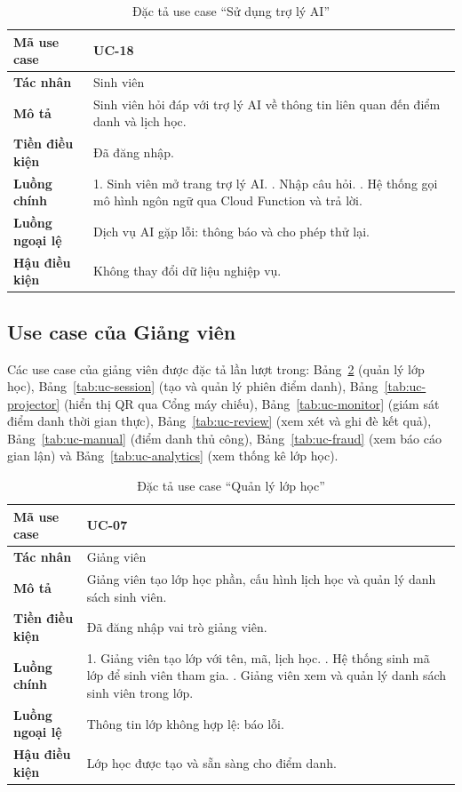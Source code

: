 \begin{table}[H]
\centering
\small
\caption{Đặc tả use case ``Sử dụng trợ lý AI''}
\label{tab:uc-ai}
\begin{tabular}{|p{3cm}|p{10.6cm}|}
\hline
\textbf{Mã use case} & UC-18 \\ \hline
\textbf{Tác nhân} & Sinh viên \\ \hline
\textbf{Mô tả} & Sinh viên hỏi đáp với trợ lý AI về thông tin liên quan đến điểm danh và lịch học. \\ \hline
\textbf{Tiền điều kiện} & Đã đăng nhập. \\ \hline
\textbf{Luồng chính} & 1. Sinh viên mở trang trợ lý AI. \newline 2. Nhập câu hỏi. \newline 3. Hệ thống gọi mô hình ngôn ngữ qua Cloud Function và trả lời. \\ \hline
\textbf{Luồng ngoại lệ} & Dịch vụ AI gặp lỗi: thông báo và cho phép thử lại. \\ \hline
\textbf{Hậu điều kiện} & Không thay đổi dữ liệu nghiệp vụ. \\ \hline
\end{tabular}
\end{table}

\subsection{Use case của Giảng viên}

Các use case của giảng viên được đặc tả lần lượt trong: Bảng~\ref{tab:uc-class} (quản lý lớp
học), Bảng~\ref{tab:uc-session} (tạo và quản lý phiên điểm danh), Bảng~\ref{tab:uc-projector}
(hiển thị QR qua Cổng máy chiếu), Bảng~\ref{tab:uc-monitor} (giám sát điểm danh thời gian
thực), Bảng~\ref{tab:uc-review} (xem xét và ghi đè kết quả), Bảng~\ref{tab:uc-manual} (điểm
danh thủ công), Bảng~\ref{tab:uc-fraud} (xem báo cáo gian lận) và Bảng~\ref{tab:uc-analytics}
(xem thống kê lớp học).

\begin{table}[H]
\centering
\small
\caption{Đặc tả use case ``Quản lý lớp học''}
\label{tab:uc-class}
\begin{tabular}{|p{3cm}|p{10.6cm}|}
\hline
\textbf{Mã use case} & UC-07 \\ \hline
\textbf{Tác nhân} & Giảng viên \\ \hline
\textbf{Mô tả} & Giảng viên tạo lớp học phần, cấu hình lịch học và quản lý danh sách sinh viên. \\ \hline
\textbf{Tiền điều kiện} & Đã đăng nhập vai trò giảng viên. \\ \hline
\textbf{Luồng chính} & 1. Giảng viên tạo lớp với tên, mã, lịch học. \newline 2. Hệ thống sinh mã lớp để sinh viên tham gia. \newline 3. Giảng viên xem và quản lý danh sách sinh viên trong lớp. \\ \hline
\textbf{Luồng ngoại lệ} & Thông tin lớp không hợp lệ: báo lỗi. \\ \hline
\textbf{Hậu điều kiện} & Lớp học được tạo và sẵn sàng cho điểm danh. \\ \hline
\end{tabular}
\end{table}

